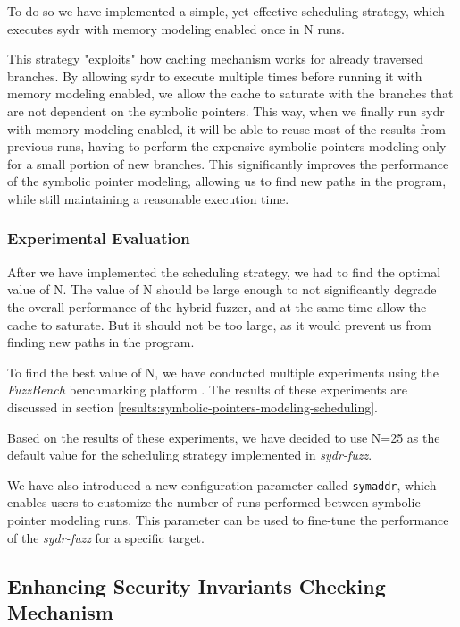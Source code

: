 To do so we have implemented a simple, yet effective scheduling strategy, which executes sydr with memory modeling enabled once in N runs.

This strategy "exploits" how caching mechanism works for already traversed branches. By allowing sydr to execute multiple times before running it with memory modeling enabled, we allow the cache to saturate with the branches that are not dependent on the symbolic pointers. This way, when we finally run sydr with memory modeling enabled, it will be able to reuse most of the results from previous runs, having to perform the expensive symbolic pointers modeling only for a small portion of new branches. This significantly improves the performance of the symbolic pointer modeling, allowing us to find new paths in the program, while still maintaining a reasonable execution time.

\subsubsection{Experimental Evaluation}

After we have implemented the scheduling strategy, we had to find the optimal value of N. The value of N should be large enough to not significantly degrade the overall performance of the hybrid fuzzer, and at the same time allow the cache to saturate. But it should not be too large, as it would prevent us from finding new paths in the program.

To find the best value of N, we have conducted multiple experiments using the \textit{FuzzBench} benchmarking platform \cite{fuzzbench-2021}. The results of these experiments are discussed in section \ref{results:symbolic-pointers-modeling-scheduling}.

Based on the results of these experiments, we have decided to use N=25 as the default value for the scheduling strategy implemented in \textit{sydr-fuzz}.

We have also introduced a new configuration parameter called \texttt{symaddr}, which enables users to customize the number of runs performed between symbolic pointer modeling runs. This parameter can be used to fine-tune the performance of the \textit{sydr-fuzz} for a specific target.

\subsection{Enhancing Security Invariants Checking Mechanism} \label{hybrid-fuzzer-improvements:optimizing-security-predicates}

